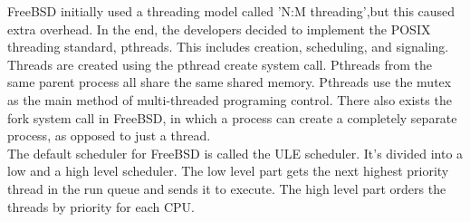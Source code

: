 \documentclass[titlepage]{article}
\begin{document}
\begin{singlespace}
    FreeBSD initially used a threading model called 'N:M threading',but this caused extra overhead. In the end, the developers decided to implement the POSIX threading standard, pthreads. This includes creation, scheduling, and signaling. Threads are created using the pthread create system call. Pthreads from the same parent process all share the same shared memory. Pthreads use the mutex as the main method of multi-threaded programing control. There also exists the fork system call in FreeBSD, in which a process can create a completely separate process, as opposed to just a thread. \\
    The default scheduler for FreeBSD is called the ULE scheduler. It's divided into a low and a high level scheduler. The low level part gets the next highest priority thread in the run queue and sends it to execute. The high level part orders the threads by priority for each CPU. \cite{freebsdch4}\\


\end{singlespace}
\end{document}
